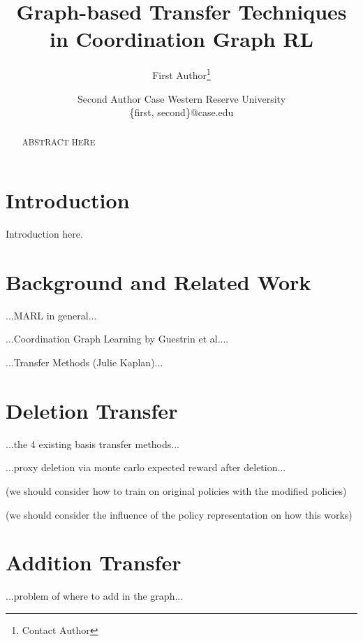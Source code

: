 \documentclass{article}
\title{Graph-based Transfer Techniques in Coordination Graph RL}
\author{ %
First Author\footnote{Contact Author}\and
Second Author
\affiliations
Case Western Reserve University\\
\emails  %
\{first, second\}@case.edu
}
\begin{document}
\maketitle

\begin{abstract}
ABSTRACT HERE
\end{abstract}

\section{Introduction} %
\label{sec:introduction}

Introduction here.


\section{Background and Related Work} %
\label{sec:background_and_related_work}

...MARL in general...

...Coordination Graph Learning by Guestrin et al....

...Transfer Methods (Julie Kaplan)...


\section{Deletion Transfer} %
\label{sec:deletion_transfer}

...the 4 existing basis transfer methods...


...proxy deletion via monte carlo expected reward after deletion...

(we should consider how to train on original policies with the modified policies)

(we should consider the influence of the policy representation on how this works)


\section{Addition Transfer} %
\label{sec:addition_transfer}

...problem of where to add in the graph...
\end{document}
